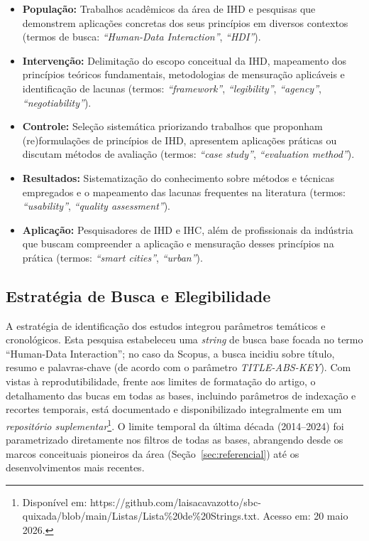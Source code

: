 \documentclass[12pt]{article}
\begin{document}
\begin{itemize}
\item \textbf{População:} Trabalhos acadêmicos da área de IHD e pesquisas que demonstrem aplicações concretas dos seus princípios em diversos contextos (termos de busca: \textit{``Human-Data Interaction''}, \textit{``HDI''}).
\item \textbf{Intervenção:} Delimitação do escopo conceitual da IHD, mapeamento dos princípios teóricos fundamentais, metodologias de mensuração aplicáveis e identificação de lacunas (termos: \textit{``framework''}, \textit{``legibility''}, \textit{``agency''}, \textit{``negotiability''}).
\item \textbf{Controle:} Seleção sistemática priorizando trabalhos que proponham (re)formulações de princípios de IHD, apresentem aplicações práticas ou discutam métodos de avaliação (termos: \textit{``case study''}, \textit{``evaluation method''}).
\item \textbf{Resultados:} Sistematização do conhecimento sobre métodos e técnicas empregados e o mapeamento das lacunas frequentes na literatura (termos: \textit{``usability''}, \textit{``quality assessment''}).
\item \textbf{Aplicação:} Pesquisadores de IHD e IHC, além de profissionais da indústria que buscam compreender a aplicação e mensuração desses princípios na prática (termos: \textit{``smart cities''}, \textit{``urban''}).
\end{itemize}

\subsection{Estratégia de Busca e Elegibilidade}
\label{estrategiaDeBusca}

    A estratégia de identificação dos estudos integrou parâmetros temáticos e cronológicos. Esta pesquisa estabeleceu uma \textit{string} de busca base focada no termo ``Human-Data Interaction''; no caso da Scopus, a busca incidiu sobre título, resumo e palavras-chave (de acordo com o parâmetro \textit{TITLE-ABS-KEY}). Com vistas à reprodutibilidade, frente aos limites de formatação do artigo, o detalhamento das bucas em todas as bases, incluindo parâmetros de indexação e recortes temporais, está documentado e disponibilizado integralmente em um \emph{repositório suplementar}\footnote{Disponível em: https://github.com/laisacavazotto/sbc-quixada/blob/main/Listas/Lista\%20de\%20Strings.txt. Acesso em: 20 maio 2026.}. O limite temporal da última década (2014--2024) foi parametrizado diretamente nos filtros de todas as bases, abrangendo desde os marcos conceituais pioneiros da área (Seção~\ref{sec:referencial}) até os desenvolvimentos mais recentes.
\end{document}
